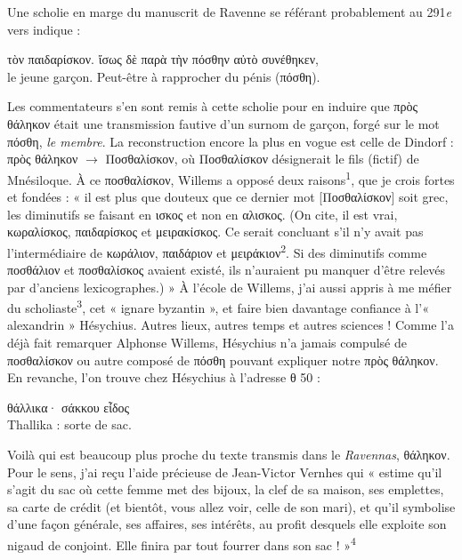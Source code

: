 \documentclass[12pt]{book}%
\newcommand{\italique}[1]{\textit{#1}}%
\newcommand{\citComm}[1]{\begin{quoting}[vskip=0pt] #1 \end{quoting}}%
\newcommand{\nieme}[1]{#1\italique{e}}%
\newcommand{\marqueur}[1]{\textsuperscript{#1}}%
\newenvironment{groupe}{%
\pstart%
\ledgroup%
}{%
\pend %
}%
\begin{document}
\begin{pages}
\begin{Leftside}
\begin{groupe}
{{%
Une scholie en marge du manuscrit de Ravenne se référant probablement au \nieme{291} vers indique :%
\citComm{τὸν παιδαρίσκον. ἴσως δὲ παρὰ τὴν πόσθην αὐτὸ συνέθηκεν,\\
le jeune garçon. Peut-être à rapprocher du pénis (πόσθη).}%
Les commentateurs s'en sont remis à cette scholie pour en induire que πρὸς θάληκον était une transmission fautive d'un surnom de garçon, forgé sur le mot πόσθη, \italique{le membre}. %
La reconstruction encore la plus en vogue est celle de Dindorf : πρὸς θάληκον $ \to $ Ποσθαλίσκον, où Ποσθαλίσκον désignerait le fils (fictif) de Mnésiloque. 
À ce ποσθαλίσκον, Willems a opposé deux raisons\marqueur{1}, que je crois fortes et fondées : « il est plus que douteux que ce dernier mot [Ποσθαλίσκον] soit grec, les diminutifs se faisant en ισκος et non en αλισκος. (On cite, il est vrai, κωραλίσκος, παιδαρίσκος et μειρακίσκος. Ce serait concluant s'il n'y avait pas l'intermédiaire de κωράλιον, παιδάριον et μειράκιον\marqueur{2}. Si des diminutifs comme ποσθάλιον et ποσθαλίσκος avaient existé, ils n'auraient pu manquer d'être relevés par d'anciens lexicographes.) »
À l'école de Willems, j'ai aussi appris à me méfier du scholiaste\marqueur{3}, cet « ignare byzantin », et faire bien davantage confiance à l'« alexandrin » Hésychius. Autres lieux, autres temps et autres sciences !
Comme l'a déjà fait remarquer Alphonse Willems, Hésychius n'a jamais compulsé de ποσθαλίσκον ou autre composé de πόσθη pouvant expliquer notre πρὸς θάληκον. 
En revanche, l'on trouve chez Hésychius à l'adresse θ 50 :
\citComm{θάλλικα· σάκκου εἶδος\\
Thallika : sorte de sac.}%
Voilà qui est beaucoup plus proche du texte transmis dans le \italique{Ravennas}, θάληκον. 
Pour le sens, j'ai reçu l'aide précieuse de Jean-Victor Vernhes qui « estime qu'il s'agit du sac où cette femme met des bijoux, la clef de sa maison, ses emplettes, sa carte de crédit (et bientôt, vous allez voir, celle de son mari), et qu'il symbolise d'une façon générale, ses affaires, ses intérêts, au profit desquels elle exploite son nigaud de conjoint. Elle finira par tout fourrer dans son sac ! »\marqueur{4}
}}
\end{groupe}
\end{Leftside}
\end{pages}
\end{document}
